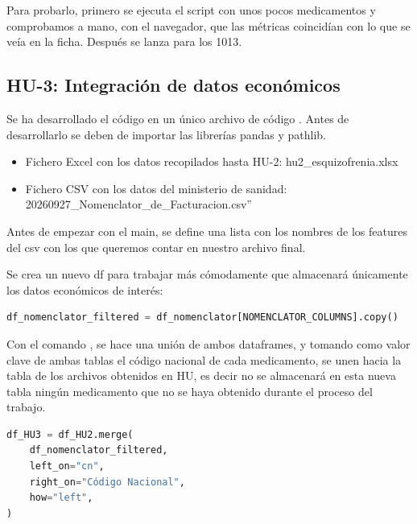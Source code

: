 \documentclass[11pt,a4paper]{article}
\begin{document}
Para probarlo, primero se ejecuta el script con unos pocos medicamentos y comprobamos a
mano, con el navegador, que las métricas coincidían con lo que se veía en la ficha. Después se lanza para los 1013.

\subsection{HU-3: Integración de datos económicos}
Se ha
desarrollado el código en un único archivo de código . Antes de desarrollarlo se deben
de importar las librerías pandas y pathlib.

\begin{itemize}
  \item Fichero Excel con los datos recopilados hasta HU-2: hu2\_esquizofrenia.xlsx
  \item Fichero CSV con los datos del ministerio de sanidad:
        20260927\_Nomenclator\_de\_Facturacion.csv”
\end{itemize}

Antes de empezar con el main, se define una lista con los nombres de los features del csv con los que queremos contar en nuestro archivo final.

Se crea un nuevo df para trabajar más cómodamente que almacenará únicamente los datos económicos de interés:

\noindent\begin{minipage}{\linewidth}
\begin{lstlisting}[language=Python, caption={Selección de datos de interés de la base de datos económicos.}, label={lst:hu3_seleccion_columnas_nomenclator}]
df_nomenclator_filtered = df_nomenclator[NOMENCLATOR_COLUMNS].copy()
\end{lstlisting}
\end{minipage}

Con el comando , se hace una unión de ambos
dataframes, y tomando como valor clave de ambas tablas el código nacional de cada
medicamento, se unen hacia la tabla de los archivos obtenidos en HU, es decir no se
almacenará en esta nueva tabla ningún medicamento que no se haya obtenido durante el
proceso del trabajo.

\noindent\begin{minipage}{\linewidth}
\begin{lstlisting}[language=Python, caption={Merge de ambas tablas de datos}, label={lst:hu3_merge_tablas}]
df_HU3 = df_HU2.merge(
    df_nomenclator_filtered,
    left_on="cn",
    right_on="Código Nacional",
    how="left",
)
\end{lstlisting}
\end{minipage}
\end{document}

